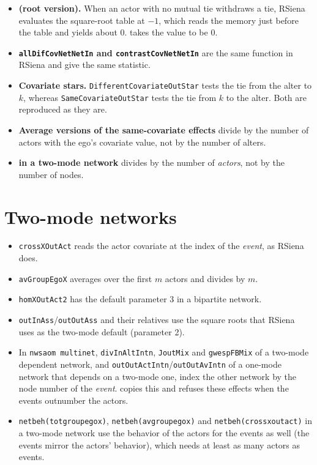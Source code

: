 \begin{itemize}
\item \textbf{ (root version).} When an actor with no mutual tie
  withdraws a tie, RSiena evaluates the square-root table at $-1$, which reads
  the memory just before the table and yields about 0. \nwsaom{} takes the value
  to be 0.
\item \textbf{\texttt{allDifCovNetNetIn} and \texttt{contrastCovNetNetIn}} are
  the same function in RSiena and give the same statistic.
\item \textbf{Covariate stars.} \texttt{DifferentCovariateOutStar} tests the tie
  from the alter to $k$, whereas \texttt{SameCovariateOutStar} tests the tie from
  $k$ to the alter. Both are reproduced as they are.
\item \textbf{Average versions of the same-covariate effects} divide by the number
  of actors with the ego's covariate value, not by the number of alters.
\item \textbf{ in a two-mode network} divides by the number of
  \emph{actors}, not by the number of nodes.
\end{itemize}

\section*{Two-mode networks}

\begin{itemize}
\item \texttt{crossXOutAct} reads the actor covariate at the index of the
  \emph{event}, as RSiena does.
\item \texttt{avGroupEgoX} averages over the first $m$ actors and divides by
  $m$.
\item \texttt{homXOutAct2} has the default parameter 3 in a bipartite network.
\item \texttt{outInAss}/\texttt{outOutAss} and their relatives use the square
  roots that RSiena uses as the two-mode default (parameter 2).
\item In \texttt{nwsaom multinet}, \texttt{divInAltIntn}, \texttt{JoutMix} and
  \texttt{gwespFBMix} of a two-mode dependent network, and
  \texttt{outOutActIntn}/\texttt{outOutAvIntn} of a one-mode network that depends on a
  two-mode one, index the other network by the node number of the \emph{event}. \nwsaom{}
  copies this and refuses these effects when the events outnumber the actors.
\item \texttt{netbeh(totgroupegox)}, \texttt{netbeh(avgroupegox)} and
  \texttt{netbeh(crossxoutact)} in a two-mode network use the behavior of the actors for
  the events as well (the events mirror the actors' behavior), which needs at least as many actors
  as events.
\end{itemize}

